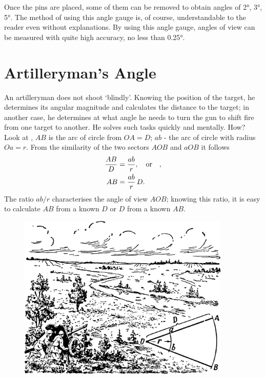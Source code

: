 Once the pins are placed, some of them can be removed to obtain angles of \ang{2}, \ang{3}, \ang{5}. The method of using this angle gauge is, of course, understandable to the reader even without explanations. By using this angle gauge, angles of view can be measured with quite high accuracy, no less than \ang{0.25}.

\section{Artilleryman's Angle}
\label{sec-3.10}

An artilleryman does not shoot `blindly'. Knowing the position of the target, he determines its angular magnitude and calculates the distance to the target; in another case, he determines at what angle he needs to turn the gun to shift fire from one target to another. He solves such tasks quickly and mentally. How? Look at , $AB$ is the arc of circle from $OA = D$; $ab$ - the arc of circle with radius $Oa = r$. From the similarity of the two sectors $AOB$ and $aOB$ it follows
\begin{align*}%
\frac{AB}{D} & = \frac{ab}{r}, \qor , \\ 
AB & = \frac{ab}{r}\, D.
\end{align*}
The ratio $ab/r$ characterises the angle of view $AOB$; knowing this ratio, it is easy to calculate $AB$ from a known $D$ or $D$ from a known $AB$.

\begin{figure}[h!]
\centering
\includegraphics[width=0.9\textwidth]{figures/ch-03/fig-072.pdf}
\end{figure}


